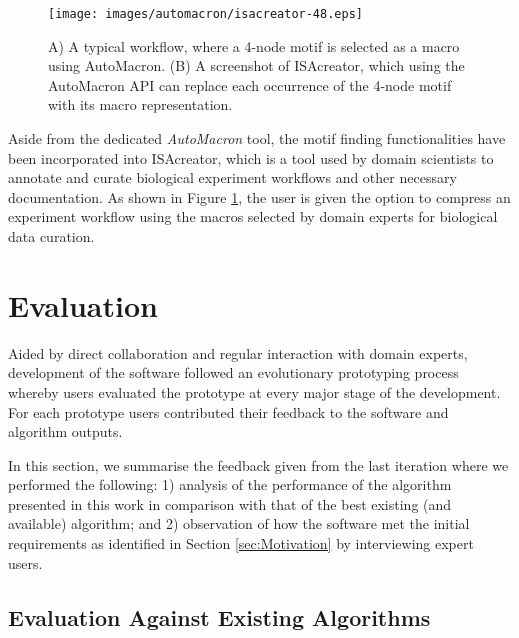 
\begin{figure}[ht!]
\centering
\texttt{[image: images/automacron/isacreator-48.eps]}
\caption{A) A typical workflow, where a 4-node motif is selected as a macro using AutoMacron. (B) A screenshot of  ISAcreator, which using the AutoMacron API can replace each occurrence of the 4-node motif with its macro representation.}
\vspace{-1mm}
\label{fig:isacreator}
\end{figure}

Aside from the dedicated \emph{AutoMacron} tool, the motif finding functionalities have been incorporated into ISAcreator, which is a tool used by domain scientists to annotate and curate biological experiment workflows and other necessary documentation. As shown in Figure \ref{fig:isacreator}, the user is given the option to compress an experiment workflow using the macros selected by domain experts for biological data curation. 

\section{Evaluation}

Aided by direct collaboration and regular interaction with domain experts, development of the software followed an evolutionary prototyping process whereby users evaluated the prototype at every major stage of the development. For each prototype users contributed their feedback to the software and algorithm outputs. 

In this section, we summarise the feedback given from the last iteration where we performed the following: 1) analysis of the performance of the algorithm presented in this work in comparison with that of the best existing (and available) algorithm; and 2) observation of how the software met the initial requirements as identified in Section \ref{sec:Motivation} by interviewing expert users.

\subsection{Evaluation Against Existing Algorithms}

